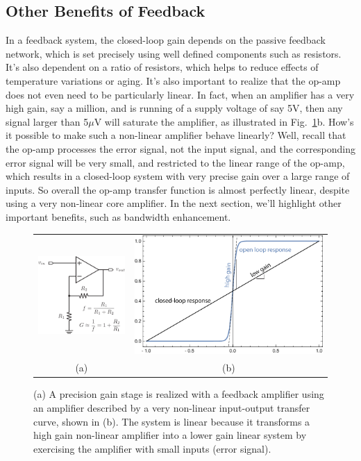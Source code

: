 \subsection{Other Benefits of Feedback}
In a feedback system, the closed-loop gain depends on the passive feedback network, which is set precisely using well defined components such as resistors.  It's also dependent on a ratio of resistors, which helps to reduce effects of temperature variations or aging.  It's also important to realize that the op-amp does not even need to be particularly linear.  In fact, when an amplifier has a very high gain, say a million, and is running of a supply voltage of say 5V, then any signal larger than 5$\mu$V will saturate the amplifier, as illustrated in Fig.~\ref{fig:opamp_fb_precise}b.  How's it possible to make such a non-linear amplifier behave linearly?  Well, recall that the op-amp processes the error signal, not the input signal, and the corresponding error signal will be very small, and restricted to the linear range of the op-amp, which results in a closed-loop system with very precise gain over a large range of inputs.  So overall the op-amp transfer function is almost perfectly linear, despite using a very non-linear core amplifier. 
In the next section, we'll highlight other important benefits, such as bandwidth enhancement.  
\begin{figure}[tb]
\centering
\begin{tabular}{cc}
\includegraphics[width=.2\columnwidth]{opamp_fb_precise} &
\includegraphics[width=.7\columnwidth]{opamp_gain}\\
(a) & (b) 
\end{tabular}
\caption{(a)  A precision gain stage is realized with a feedback amplifier using an amplifier described by a very non-linear input-output transfer curve, shown in (b).  The system is linear because it transforms a high gain non-linear amplifier into a lower gain linear system by exercising the amplifier with small inputs (error signal).}
\label{fig:opamp_fb_precise}
\end{figure}

